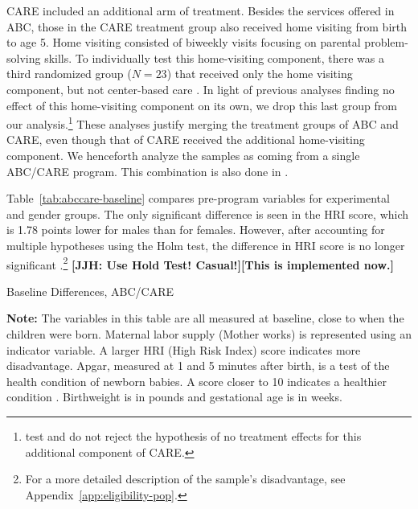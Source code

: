 CARE included an additional arm of treatment. Besides the services offered in ABC, those in the CARE treatment group also received home visiting from birth to age 5. Home visiting consisted of biweekly visits focusing on parental problem-solving skills. To individually test this home-visiting component, there was a third randomized group ($N=23$) that received only the home visiting component, but not center-based care \citep{Wasik_Ramey_etal_1990_CD}. In light of previous analyses finding no effect of this home-visiting component on its own, we drop this last group from our analysis.\footnote{\citet{Campbell_Conti_etal_2014_EarlyChildhoodInvestments} test and do not reject the hypothesis of no treatment effects for this additional component of CARE.} These analyses justify merging the treatment groups of ABC and CARE, even though that of CARE received the additional home-visiting component. We henceforth analyze the samples as coming from a single ABC/CARE program. This combination is also done in \citet{Burchinal_etal_2006_MSRCD_IV-Growth-Curve}.

Table~\ref{tab:abccare-baseline} compares pre-program variables for experimental and gender groups. The only significant difference is seen in the HRI score, which is 1.78 points lower for males than for females. However, after accounting for multiple hypotheses using the Holm test, the difference in HRI score is no longer significant \citep{Holme_1979_Sequential_SJS}.\footnote{For a more detailed description of the sample's disadvantage, see Appendix~\ref{app:eligibility-pop}.} \textbf{[JJH: Use Hold Test! Casual!][This is implemented now.]}

\begin{table}[!htbp]
\centering
\caption{Baseline Differences, ABC/CARE}
\label{tab:abccare-baseline}
\begin{threeparttable}
	
\begin{tablenotes}
\footnotesize
\item \textbf{Note:} The variables in this table are all measured at baseline, close to when the children were born. Maternal labor supply (Mother works) is represented using an indicator variable. A larger HRI (High Risk Index) score indicates more disadvantage. Apgar, measured at 1 and 5 minutes after birth, is a test of the health condition of newborn babies. A score closer to 10 indicates a healthier condition \citep{Apgar_1966_APGAR-Scoring_PCNA}. Birthweight is in pounds and gestational age is in weeks.
\end{tablenotes}
\end{threeparttable}
\end{table}

